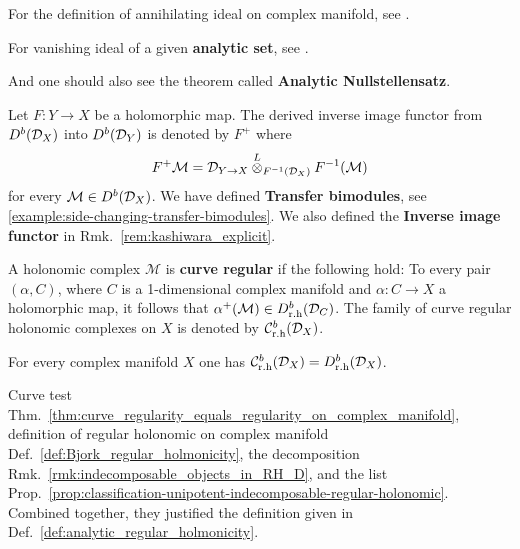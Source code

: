 \begin{remark}
    \begin{remark}
        For the definition of annihilating ideal on complex manifold, see \cite[1.6.11~Characteristic~ideals. and 1.6.15~Remark.]{Bjork1993AnalyticDModules}.

        For vanishing ideal of a given \textbf{analytic set}, see \cite[A:V.l.~THE~CATEGORY~OF~O-MODULES]{Bjork1993AnalyticDModules}.

        And one should also see the theorem called \textbf{Analytic Nullstellensatz}.
    \end{remark}

    \begin{definition}
        \cite[Def.~2.3.6.]{Bjork1993AnalyticDModules}
        Let $F: Y \to X$ be a holomorphic map. The derived inverse image functor from $D^b(\mathcal{D}_X)$ into $D^b(\mathcal{D}_Y)$ is denoted by $F^+$ where
        \[
            F^+ \mathcal{M} = \mathcal{D}_{Y \to X} \overset{L}{\otimes}_{F^{-1}(\mathcal{D}_X)} F^{-1}(\mathcal{M})
        \]
        for every $\mathcal{M} \in D^b(\mathcal{D}_X)$.
        We have defined \textbf{Transfer bimodules}, see \ref{example:side-changing-transfer-bimodules}.
        We also defined the \textbf{Inverse image functor} in Rmk.~\ref{rem:kashiwara_explicit}.
    \end{definition}

    \begin{definition}
        \cite[Def.~5.6.1.]{Bjork1993AnalyticDModules}
        A holonomic complex $\mathcal{M}$ is \textbf{curve regular} if the following hold:
        To every pair $(\alpha, C)$, where $C$ is a 1-dimensional complex manifold and $\alpha: C \to X$ a holomorphic map, it follows that $\alpha^+(\mathcal{M}) \in D^b_{\mathrm{r.h}}(\mathcal{D}_C)$.
        The family of curve regular holonomic complexes on $X$ is denoted by $\mathcal{C}^b_{\mathrm{r.h}}(\mathcal{D}_X)$.
    \end{definition}

    \begin{theorem}\label{thm:curve_regularity_equals_regularity_on_complex_manifold}
        \cite[Thm.~5.6.2.]{Bjork1993AnalyticDModules}
        For every complex manifold $X$ one has $\mathcal{C}^b_{\mathrm{r.h}}(\mathcal{D}_X) = D^b_{\mathrm{r.h}}(\mathcal{D}_X)$.
    \end{theorem}

    Curve test Thm.~\ref{thm:curve_regularity_equals_regularity_on_complex_manifold},
    definition of regular holonomic on complex manifold Def.~\ref{def:Bjork_regular_holmonicity},
    the decomposition Rmk.~\ref{rmk:indecomposable_objects_in_RH_D},
    and the list Prop.~\ref{prop:classification-unipotent-indecomposable-regular-holonomic}.
    Combined together, they justified the definition given in Def.~\ref{def:analytic_regular_holmonicity}.


\end{remark}
